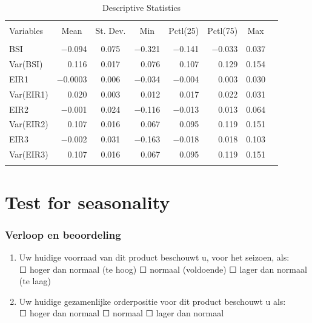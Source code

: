 \documentclass{article}[]
\begin{document}
\begin{table}[!htbp] \centering 
  \caption{Descriptive Statistics} 
  \label{tab:descriptive stats} 
\begin{tabular}{@{\extracolsep{5pt}}lrcrrrrr} 
\\[-1.8ex]\hline 
\hline \\[-1.8ex] 
Variables & \multicolumn{1}{c}{Mean} & \multicolumn{1}{c}{St. Dev.} & \multicolumn{1}{c}{Min} & \multicolumn{1}{c}{Pctl(25)} & \multicolumn{1}{c}{Pctl(75)} & \multicolumn{1}{c}{Max} \\ 
\hline \\[-1.8ex] 
BSI & $-$0.094 & 0.075 & $-$0.321 & $-$0.141 & $-$0.033 & 0.037 \\ 
Var(BSI) & 0.116 & 0.017 & 0.076 & 0.107 & 0.129 & 0.154 \\ 
EIR1 & $-$0.0003 & 0.006 & $-$0.034 & $-$0.004 & 0.003 & 0.030 \\ 
Var(EIR1) & 0.020 & 0.003 & 0.012 & 0.017 & 0.022 & 0.031 \\ 
EIR2 & $-$0.001 & 0.024 & $-$0.116 & $-$0.013 & 0.013 & 0.064 \\ 
Var(EIR2) & 0.107 & 0.016 & 0.067 & 0.095 & 0.119 & 0.151 \\ 
EIR3 & $-$0.002 & 0.031 & $-$0.163 & $-$0.018 & 0.018 & 0.103 \\ 
Var(EIR3) & 0.107 & 0.016 & 0.067 & 0.095 & 0.119 & 0.151 \\ 
\hline \\[-1.8ex] 
\end{tabular} 
\end{table} 



\section*{Test for seasonality}
\label{sec:test for seasonality}



\subsubsection*{Verloop en beoordeling}
\begin{enumerate}
    \item Uw huidige voorraad van dit product beschouwt u, voor het seizoen, als: \\
	$\Square$	hoger dan normaal (te hoog)	$\Square$	normaal (voldoende)	$\Square$ lager dan normaal (te laag)
	
    \item Uw huidige gezamenlijke orderpositie voor dit product beschouwt u als: \\
	$\Square$ hoger dan normaal $\Square$ normaal $\Square$ lager dan normaal
\end{enumerate}
\end{document}
